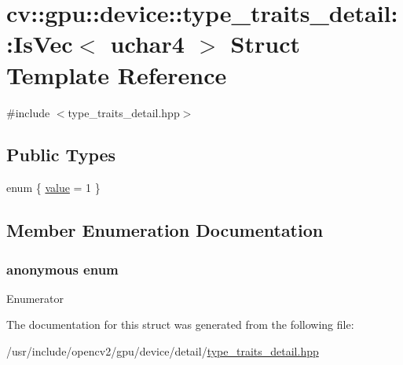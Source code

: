 \hypertarget{structcv_1_1gpu_1_1device_1_1type__traits__detail_1_1IsVec_3_01uchar4_01_4}{\section{cv\-:\-:gpu\-:\-:device\-:\-:type\-\_\-traits\-\_\-detail\-:\-:Is\-Vec$<$ uchar4 $>$ Struct Template Reference}
\label{structcv_1_1gpu_1_1device_1_1type__traits__detail_1_1IsVec_3_01uchar4_01_4}
}


{\ttfamily \#include $<$type\-\_\-traits\-\_\-detail.\-hpp$>$}

\subsection*{Public Types}
\begin{DoxyCompactItemize}
\item 
enum \{ \hyperlink{structcv_1_1gpu_1_1device_1_1type__traits__detail_1_1IsVec_3_01uchar4_01_4_adc7321d651223a689827a3cc7aa4c4d7a2ac6a73eac4b2dc5f45fe2ba3586681f}{value} = 1
 \}
\end{DoxyCompactItemize}


\subsection{Member Enumeration Documentation}
\hypertarget{structcv_1_1gpu_1_1device_1_1type__traits__detail_1_1IsVec_3_01uchar4_01_4_adc7321d651223a689827a3cc7aa4c4d7}{\subsubsection[{anonymous enum}]{\setlength{\rightskip}{0pt plus 5cm}anonymous enum}}\label{structcv_1_1gpu_1_1device_1_1type__traits__detail_1_1IsVec_3_01uchar4_01_4_adc7321d651223a689827a3cc7aa4c4d7}
\begin{Desc}
\item[Enumerator]\par
\begin{description}
\item[{\em 
\hypertarget{structcv_1_1gpu_1_1device_1_1type__traits__detail_1_1IsVec_3_01uchar4_01_4_adc7321d651223a689827a3cc7aa4c4d7a2ac6a73eac4b2dc5f45fe2ba3586681f}{value}\label{structcv_1_1gpu_1_1device_1_1type__traits__detail_1_1IsVec_3_01uchar4_01_4_adc7321d651223a689827a3cc7aa4c4d7a2ac6a73eac4b2dc5f45fe2ba3586681f}
}]\end{description}
\end{Desc}


The documentation for this struct was generated from the following file\-:\begin{DoxyCompactItemize}
\item 
/usr/include/opencv2/gpu/device/detail/\hyperlink{type__traits__detail_8hpp}{type\-\_\-traits\-\_\-detail.\-hpp}\end{DoxyCompactItemize}
